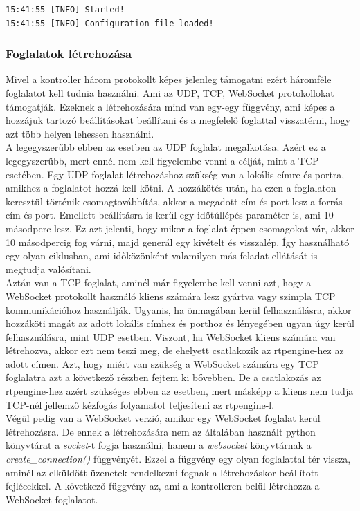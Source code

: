 \begin{lstlisting}[caption=Naplózás formátuma, label=lst:logging]
15:41:55 [INFO] Started!
15:41:55 [INFO] Configuration file loaded!
\end{lstlisting}

\subsubsection{Foglalatok létrehozása}

Mivel a kontroller három protokollt képes jelenleg támogatni ezért háromféle foglalatot 
kell tudnia használni. Ami az UDP, TCP, WebSocket protokollokat támogatják. Ezeknek a
létrehozására mind van egy-egy függvény, ami képes a hozzájuk tartozó beállításokat 
beállítani és a megfelelő foglattal visszatérni, hogy azt több helyen lehessen használni. \\

A legegyszerűbb ebben az esetben az UDP foglalat megalkotása. Azért ez a legegyszerűbb,
mert ennél nem kell figyelembe venni a célját, mint a TCP esetében. Egy UDP foglalat 
létrehozáshoz szükség van a lokális címre és portra, amikhez a foglalatot hozzá kell 
kötni. A hozzákötés után, ha ezen a foglalaton keresztül történik csomagtovábbítás, 
akkor a megadott cím és port lesz a forrás cím és port. Emellett beállításra is
kerül egy időtúllépés paraméter is, ami 10 másodperc lesz. Ez azt jelenti, hogy
mikor a foglalat éppen csomagokat vár, akkor 10 másodpercig fog várni, majd generál 
egy kivételt és visszalép. Így használható egy olyan ciklusban, ami időközönként
valamilyen más feladat ellátását is megtudja valósítani. \\

Aztán van a TCP foglalat, aminél már figyelembe kell venni azt, hogy a WebSocket
protokollt használó kliens számára lesz gyártva vagy szimpla TCP kommunikációhoz 
használják. Ugyanis, ha önmagában kerül felhasználásra, akkor hozzáköti magát
az adott lokális címhez és porthoz és lényegében ugyan úgy kerül felhasználásra,
mint UDP esetben. Viszont, ha WebSocket kliens számára van létrehozva, akkor ezt
nem teszi meg, de ehelyett csatlakozik az rtpengine-hez az adott címen. Azt, hogy
miért van szükség a WebSocket számára egy TCP foglalatra azt a következő részben 
fejtem ki bővebben. De a csatlakozás az rtpengine-hez azért szükséges ebben az
esetben, mert másképp a kliens nem tudja TCP-nél jellemző kézfogás folyamatot
teljesíteni az rtpengine-l. \\

Végül pedig van a WebSocket verzió, amikor egy WebSocket foglalat kerül létrehozásra.
De ennek a létrehozására nem az általában használt python könyvtárat a \textit{socket}-t
fogja használni, hanem a \textit{websocket} \cite{websocket} könyvtárnak a \textit{create\_connection()}
függvényét. Ezzel a függvény egy olyan foglalattal tér vissza, aminél az elküldött 
üzenetek rendelkezni fognak a létrehozáskor beállított fejlécekkel. A következő 
függvény az, ami a kontrolleren belül létrehozza a WebSocket foglalatot. 


